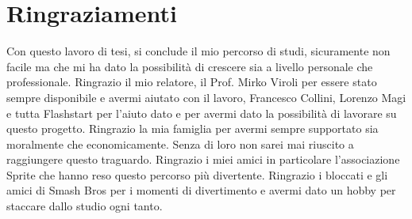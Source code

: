 \documentclass[12pt,a4paper,openright,twoside]{book}
\begin{document}

\chapter*{Ringraziamenti}
Con questo lavoro di tesi, si conclude il mio percorso di studi,
sicuramente non facile ma che mi ha dato la possibilità di crescere sia
a livello personale che professionale.  \hfill \break
Ringrazio il mio relatore, il Prof. Mirko Viroli per essere stato sempre disponibile e avermi aiutato con il lavoro,
Francesco Collini, Lorenzo Magi e tutta Flashstart per l'aiuto dato e per avermi dato la possibilità di lavorare su questo progetto.  \hfill \break
Ringrazio la mia famiglia per avermi sempre supportato sia moralmente che economicamente. Senza
di loro non sarei mai riuscito a raggiungere questo traguardo.  \hfill \break
Ringrazio i miei amici in particolare l'associazione Sprite che hanno
reso questo percorso più divertente.
Ringrazio i bloccati e gli amici di Smash Bros per i momenti di divertimento e avermi dato un hobby per
staccare dallo studio ogni tanto.
\end{document}
